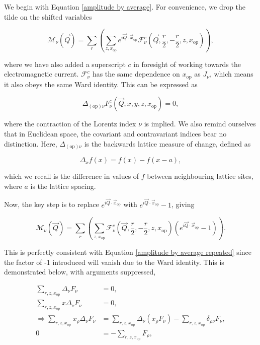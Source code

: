 \documentclass{article}
\numberwithin{equation}{section} %
\begin{document}
We begin with Equation \ref{amplitude by average}. For convenience, we drop the tilde on the shifted variables

\begin{equation}
\mathcal{M}_\nu(\vec{Q})= \sum_r\left(\sum_{z,x_\mathrm{op}} e^{i\vec{Q}\cdot\vec{x}_\mathrm{op}} \mathcal{F}^c_\nu(\vec{Q},\frac{r}{2},-\frac{r}{2},z,x_\mathrm{op})\right),
\label{amplitude by average repeated}
\end{equation}

\noindent where we have also added a superscript $c$ in foresight of working towards the electromagnetic current. $\mathcal{F}^c_\nu$ has the same dependence on $x_\mathrm{op}$ as $J_\nu$, which means it also obeys the same Ward identity. This can be expressed as 

\begin{equation}
\Delta_{\mathrm{(op)}\nu}F^c_\nu(\vec{Q},x,y,z,x_\mathrm{op})=0,
\end{equation}

\noindent where the contraction of the Lorentz index $\nu$ is implied. We also remind ourselves that in Euclidean space, the covariant and contravariant indices bear no distinction. Here, $\Delta_{\mathrm{(op)}\nu}$ is the backwards lattice measure of change, defined as 

\begin{equation}
\Delta_xf(x) = f(x) - f(x-a),
\end{equation}

\noindent which we recall is the difference in values of $f$ between neighbouring lattice sites, where $a$ is the lattice spacing. 

Now, the key step is to replace $e^{i\vec{Q}\cdot\vec{x}_\mathrm{op}}$ with $e^{i\vec{Q}\cdot\vec{x}_\mathrm{op}}-1$, giving

\begin{equation}
\mathcal{M}_\nu(\vec{Q})= \sum_r\left(\sum_{z,x_\mathrm{op}} \mathcal{F}^c_\nu(\vec{Q},\frac{r}{2},-\frac{r}{2},z,x_\mathrm{op})(e^{i\vec{Q}\cdot\vec{x}_\mathrm{op}}-1)\right).
\label{amplitude by average -1}
\end{equation}

This is perfectly consistent with Equation \ref{amplitude by average repeated} since the factor of -1 introduced will vanish due to the Ward identity. This is demonstrated below, with arguments suppressed,

\begin{equation}
\begin{split}
\sum_{r,z,x_\mathrm{op}}\Delta_\nu F_\nu &= 0,\\
\sum_{r,z,x_\mathrm{op}}x\Delta_\nu F_\nu &= 0,\\
\Rightarrow\sum_{r,z,x_\mathrm{op}}x_\rho\Delta_\nu F_\nu &= \sum_{r,z,x_\mathrm{op}} \Delta_\nu (x_\rho F_\nu) - \sum_{r,z,x_\mathrm{op}}\delta_{\rho\nu}F_\nu,\\
0&= -\sum_{r,z,x_\mathrm{op}}F_\rho,
\end{split}
\end{equation}
\end{document}
